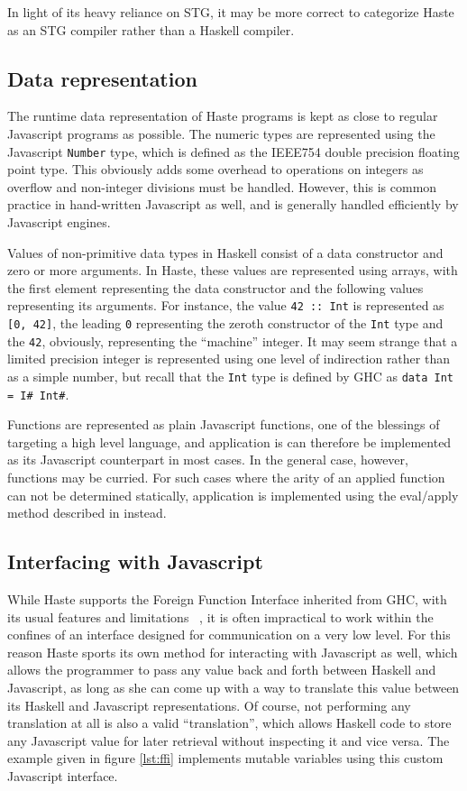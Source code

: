 \documentclass[preprint]{sigplanconf}
\begin{document}
In light of its heavy reliance on STG, it may be more correct to categorize
Haste as an STG compiler rather than a Haskell compiler.

\subsection{Data representation}

The runtime data representation of Haste programs is kept as close to regular
Javascript programs as possible. The numeric types are represented using the
Javascript \lstinline!Number! type, which is defined as the IEEE754 double
precision floating point type. This obviously adds some overhead to operations
on integers as overflow and non-integer divisions must be handled. However, this
is common practice in hand-written Javascript as well, and is generally handled
efficiently by Javascript engines.

Values of non-primitive data types in Haskell consist of a data constructor and
zero or more arguments. In Haste, these values are represented using arrays,
with the first element representing the data constructor and the following
values representing its arguments. For instance, the value \lstinline!42 :: Int!
is represented as \lstinline![0, 42]!, the leading \lstinline!0! representing
the zeroth constructor of the \lstinline!Int! type and the \lstinline!42!,
obviously, representing the ``machine'' integer. It may seem strange that a
limited precision integer is represented using one level of indirection rather
than as a simple number, but recall that the \lstinline!Int! type is defined by
GHC as \lstinline!data Int = I# Int#!.

Functions are represented as plain Javascript functions, one of the blessings
of targeting a high level language, and application is can therefore be
implemented as its Javascript counterpart in most cases. In the general case,
however, functions may be curried. For such cases where the arity of an applied
function can not be determined statically, application is implemented using the
eval/apply method described in \cite{fastcurry} instead.

\subsection{Interfacing with Javascript}

While Haste supports the Foreign Function Interface inherited from GHC, with
its usual features and limitations \ \cite{ffi}, it is often impractical to
work within the confines of an interface designed for communication on a very
low level. For this reason Haste sports its own method for interacting with
Javascript as well, which allows the programmer to pass any value back and
forth between Haskell and Javascript, as long as she can come up with a way to
translate this value between its Haskell and Javascript representations.
Of course, not performing any translation at all is also a valid
``translation'', which allows Haskell code to store any Javascript value for
later retrieval without inspecting it and vice versa. The example given in
figure \ref{lst:ffi} implements mutable variables using this custom Javascript
interface.
\end{document}
